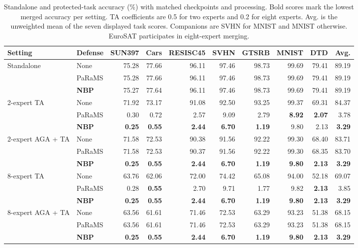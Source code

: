 \begin{table}[!t]
\centering
\small
\setlength{\tabcolsep}{4pt}
\caption{Standalone and protected-task accuracy (\%) with matched checkpoints and processing. Bold scores mark the lowest merged accuracy per setting. TA coefficients are 0.5 for two experts and 0.2 for eight experts. Avg. is the unweighted mean of the seven displayed task scores. Companions are SVHN for MNIST and MNIST otherwise. EuroSAT participates in eight-expert merging.}
\label{tab:main}
\begin{tabular}{llrrrrrrrr}
\toprule
Setting & Defense & SUN397 & Cars & RESISC45 & SVHN & GTSRB & MNIST & DTD & Avg. \\
\midrule
\multirow{3}{*}{Standalone} & None & 75.28 & 77.66 & 96.11 & 97.46 & 98.73 & 99.69 & 79.41 & 89.19 \\
 & PaRaMS & 75.28 & 77.66 & 96.11 & 97.46 & 98.73 & 99.69 & 79.41 & 89.19 \\
 & \textbf{NBP} & 75.27 & 77.64 & 96.11 & 97.46 & 98.73 & 99.69 & 79.41 & 89.19 \\
\midrule
\multirow{3}{*}{2-expert TA} & None & 71.92 & 73.17 & 91.08 & 92.50 & 93.25 & 99.37 & 69.31 & 84.37 \\
 & PaRaMS & 0.30 & 0.72 & 2.57 & 9.09 & 2.79 & \textbf{8.92} & \textbf{2.07} & 3.78 \\
 & \textbf{NBP} & \textbf{0.25} & \textbf{0.55} & \textbf{2.44} & \textbf{6.70} & \textbf{1.19} & 9.80 & 2.13 & \textbf{3.29} \\
\midrule
\multirow{3}{*}{2-expert AGA + TA} & None & 71.58 & 72.53 & 90.38 & 91.56 & 92.22 & 99.30 & 68.40 & 83.71 \\
 & PaRaMS & 71.58 & 72.53 & 90.37 & 91.56 & 92.22 & 99.30 & 68.35 & 83.70 \\
 & \textbf{NBP} & \textbf{0.25} & \textbf{0.55} & \textbf{2.44} & \textbf{6.70} & \textbf{1.19} & \textbf{9.80} & \textbf{2.13} & \textbf{3.29} \\
\midrule
\multirow{3}{*}{8-expert TA} & None & 63.76 & 62.06 & 72.00 & 74.42 & 65.08 & 94.00 & 52.18 & 69.07 \\
 & PaRaMS & 0.28 & \textbf{0.55} & 2.70 & 9.71 & 1.77 & 9.82 & \textbf{2.13} & 3.85 \\
 & \textbf{NBP} & \textbf{0.25} & \textbf{0.55} & \textbf{2.44} & \textbf{6.70} & \textbf{1.19} & \textbf{9.80} & \textbf{2.13} & \textbf{3.29} \\
\midrule
\multirow{3}{*}{8-expert AGA + TA} & None & 63.56 & 61.61 & 71.46 & 72.53 & 63.29 & 93.23 & 51.38 & 68.15 \\
 & PaRaMS & 63.56 & 61.61 & 71.46 & 72.53 & 63.29 & 93.23 & 51.38 & 68.15 \\
 & \textbf{NBP} & \textbf{0.25} & \textbf{0.55} & \textbf{2.44} & \textbf{6.70} & \textbf{1.19} & \textbf{9.80} & \textbf{2.13} & \textbf{3.29} \\
\bottomrule
\end{tabular}
\end{table}
